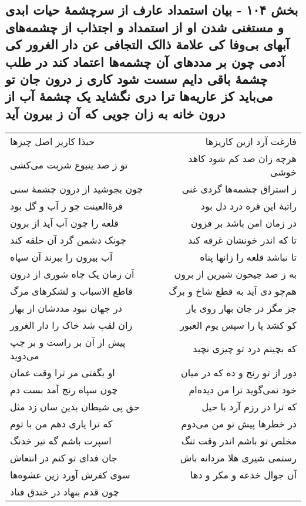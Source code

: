\begin{center}
\section*{بخش ۱۰۴ - بیان استمداد عارف از سرچشمهٔ حیات ابدی و مستغنی شدن او از استمداد و اجتذاب از چشمه‌های آبهای بی‌وفا کی علامة ذالک التجافی عن دار الغرور کی آدمی چون بر مددهای آن چشمه‌ها اعتماد کند در طلب چشمهٔ باقی دایم سست شود کاری ز درون جان تو می‌باید کز عاریه‌ها ترا دری نگشاید یک چشمهٔ آب از درون خانه به زان جویی که آن ز بیرون آید}
\label{sec:sh104}
\begin{longtable}{l p{0.5cm} r}
حبذا کاریز اصل چیزها
&&
فارغت آرد ازین کاریزها
\\
تو ز صد ینبوع شربت می‌کشی
&&
هرچه زان صد کم شود کاهد خوشی
\\
چون بجوشید از درون چشمهٔ سنی
&&
ز استراق چشمه‌ها گردی غنی
\\
قرةالعینت چو ز آب و گل بود
&&
راتبهٔ این قره درد دل بود
\\
قلعه را چون آب آید از برون
&&
در زمان امن باشد بر فزون
\\
چونک دشمن گرد آن حلقه کند
&&
تا که اندر خونشان غرقه کند
\\
آب بیرون را ببرند آن سپاه
&&
تا نباشد قلعه را زانها پناه
\\
آن زمان یک چاه شوری از درون
&&
به ز صد جیحون شیرین از برون
\\
قاطع الاسباب و لشکرهای مرگ
&&
هم‌چو دی آید به قطع شاخ و برگ
\\
در جهان نبود مددشان از بهار
&&
جز مگر در جان بهار روی یار
\\
زان لقب شد خاک را دار الغرور
&&
کو کشد پا را سپس یوم العبور
\\
پیش از آن بر راست و بر چپ می‌دوید
&&
که بچینم درد تو چیزی نچید
\\
او بگفتی مر ترا وقت غمان
&&
دور از تو رنج و ده که در میان
\\
چون سپاه رنج آمد بست دم
&&
خود نمی‌گوید ترا من دیده‌ام
\\
حق پی شیطان بدین سان زد مثل
&&
که ترا در رزم آرد با حیل
\\
که ترا یاری دهم من با توم
&&
در خطرها پیش تو من می‌دوم
\\
اسپرت باشم گه تیر خدنگ
&&
مخلص تو باشم اندر وقت تنگ
\\
جان فدای تو کنم در انتعاش
&&
رستمی شیری هلا مردانه باش
\\
سوی کفرش آورد زین عشوه‌ها
&&
آن جوال خدعه و مکر و دها
\\
چون قدم بنهاد در خندق فتاد

\end{longtable}
\end{center}
